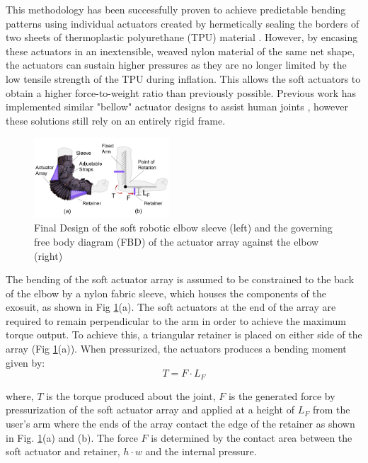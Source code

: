 \documentclass[letterpaper, 10 pt, conference]{ieeeconf}  %
\begin{document}
This methodology has been successfully proven to achieve predictable bending patterns using  individual actuators created by hermetically sealing the borders of two sheets of thermoplastic polyurethane (TPU) material \cite{ADEM:ADEM201700016,natividad2017h,Koh2017}. However, by encasing these actuators in an inextensible, weaved nylon material of the same net shape, the actuators can sustain higher pressures as they are no longer limited by the low tensile strength of the TPU during inflation.  This allows the soft actuators to obtain a higher force-to-weight ratio than previously possible. Previous work has implemented similar "bellow" actuator designs to assist human joints \cite{yamamoto2004stand}, however these solutions still rely on an entirely rigid frame.




\begin{figure}
\centering
\includegraphics[width=0.45\textwidth]{arm.PNG}
\caption{Final Design of the soft robotic elbow sleeve (left) and the governing free body diagram (FBD) of the actuator array against the elbow (right)}
\label{fig:arm}
\vspace{-1.5em}
\end{figure}
 
 The bending of the soft actuator array is assumed to be constrained to the back of the elbow by a nylon fabric sleeve, which houses the components of the exosuit, as shown in Fig \ref{fig:arm}(a). The soft actuators at the end of the array are required to remain perpendicular to the arm in order to achieve the maximum torque output.  To achieve this, a triangular retainer is placed on either side of the array (Fig \ref{fig:arm}(a)). When pressurized, the actuators produces a bending moment given by:
\begin{equation}\label{torq}
	T = F{\cdot}L_F
\end{equation}


where, $T$ is the torque produced about the joint, $F$ is the generated force by pressurization of the soft actuator array and applied at a height of $L_F$ from the user's arm where the ends of the array contact the edge of the retainer as shown in Fig. \ref{fig:arm}(a) and (b).  The force $F$ is determined by the contact area between the soft actuator and retainer, $h{\cdot}w$ and the internal pressure.
\end{document}
